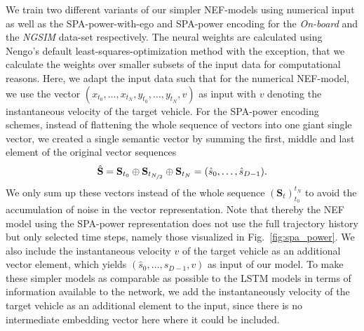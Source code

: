 We train two different variants of our simpler \ac{NEF}-models using numerical input as well as the \ac{SPA}-power-with-ego and \ac{SPA}-power encoding for the \emph{On-board} and the \emph{\ac{NGSIM}} data-set respectively.
The neural weights are calculated using \acs{Nengo}'s default least-squares-optimization method with the exception, that we calculate the weights over smaller subsets of the input data for computational reasons.
Here, we adapt the input data such that for the numerical \ac{NEF}-model, we use the vector $(x_{t_{0}}, \ldots, x_{t_{N}}, y_{t_{0}}, \ldots, y_{t_{N}}, v)$ as input with $v$ denoting the instantaneous velocity of the target vehicle.
For the \ac{SPA}-power encoding schemes, instead of flattening the whole sequence of vectors into one giant single vector, we created a single semantic vector by summing the first, middle and last element of the original vector sequences
\begin{equation}
  \hat{\mathbf{S}} =  \mathbf{S}_{t_0} \oplus \mathbf{S}_{t_{\nicefrac{N}{2}}} \oplus \mathbf{S}_{t_N} = (\hat{s}_0, \ldots, \hat{s}_{D-1}).
\end{equation}
We only sum up these vectors instead of the whole sequence $(\mathbf{S}_{t})_{t_0}^{t_N}$ to avoid the accumulation of noise in the vector representation.
Note that thereby the \ac{NEF} model using the \ac{SPA}-power representation does not use the full trajectory history but only selected time steps, namely those visualized in Fig.~\ref{fig:spa_power}.
We also include the instantaneous velocity $v$ of the target vehicle as an additional vector element, which yields $(\hat{s}_0, \ldots, \hat{s}_{D-1}, v)$ as input of our model.
To make these simpler models as comparable as possible to the \ac{LSTM} models in terms of information available to the network, we add the instantaneously velocity of the target vehicle as an additional element to the input, since there is no intermediate embedding vector here where it could be included.

